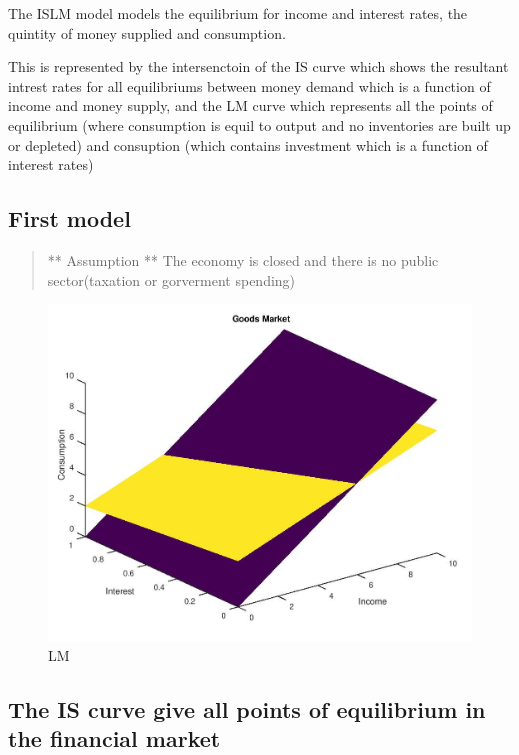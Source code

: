 \documentclass{tufte-book}
\begin{document}
The ISLM model models the equilibrium for income and interest rates, the
quintity of money supplied and consumption.

This is represented by the intersenctoin of the IS curve which shows the
resultant intrest rates for all equilibriums between money demand which
is a function of income and money supply, and the LM curve which
represents all the points of equilibrium (where consumption is equil to
output and no inventories are built up or depleted) and consuption
(which contains investment which is a function of interest rates)

\hypertarget{first-model}{%
\subsection{First model}\label{first-model}}

\begin{quote}
** Assumption ** The economy is closed and there is no public
sector(taxation or gorverment spending)
\end{quote}

\begin{figure}
\centering
\includegraphics[width=\textwidth,height=1\textwidth]{pics/LM.jpg}
\caption{LM}
\end{figure}

\hypertarget{the-is-curve-give-all-points-of-equilibrium-in-the-financial-market}{%
\subsection{The IS curve give all points of equilibrium in the financial
market}\label{the-is-curve-give-all-points-of-equilibrium-in-the-financial-market}}
\end{document}
